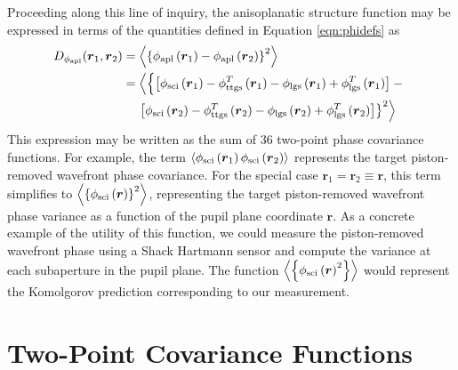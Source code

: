 Proceeding along this line of inquiry, the anisoplanatic structure
function may be expressed in terms of the quantities defined in
Equation \ref{eqn:phidefs} as
\begin{equation}\label{eqn:lgsstrfnexpansion}
\begin{split}
D_{\phi_{\rm apl}}(\boldsymbol{r}_{1},\boldsymbol{r}_{2}) & =
\left\langle \left\{\phi_{\rm apl}\left(\boldsymbol{r}_{1}\right) - 
\phi_{\rm apl}\left(\boldsymbol{r}_{2}\right)\right\}^{2}\right\rangle \\
& 
=\left\langle \left\{
\left[\phi_{\rm sci}\left(\boldsymbol{r}_{1}\right) - \phi^{T}_{\rm ttgs}\left(\boldsymbol{r}_{1}\right) - 
\phi_{\rm lgs}\left(\boldsymbol{r}_{1}\right) + \phi^{T}_{\rm lgs}\left(\boldsymbol{r}_{1}\right)\right] -
\vphantom{\left\langle\left\{\right\}^{2}\right\rangle}
\right.
\right.
\\
& \quad
\left.
\left.
\left[\phi_{\rm sci}\left(\boldsymbol{r}_{2}\right) - \phi^{T}_{\rm ttgs}\left(\boldsymbol{r}_{2}\right) - 
\phi_{\rm lgs}\left(\boldsymbol{r}_{2}\right) + \phi^{T}_{\rm lgs}\left(\boldsymbol{r}_{2}\right)\right]
\right\}^{2}\right\rangle  
\end{split}
\end{equation}
This expression may be written as the sum of 36 two-point phase
covariance functions.  For example, the term $\left\langle\phi_{\rm
  sci}\left(\boldsymbol{r}_{1}\right)\phi_{\rm
  sci}\left(\boldsymbol{r}_{2}\right)\right\rangle$ represents the
target piston-removed wavefront phase covariance.  For the special
case $\boldsymbol{r}_{1}=\boldsymbol{r}_{2}\equiv\boldsymbol{r}$, this
term simplifies to $\left\langle \left\{\phi_{\rm
  sci}\left(\boldsymbol{r}\right)\right\}^{2}\right\rangle$,
representing the target piston-removed wavefront phase variance as a
function of the pupil plane coordinate $\boldsymbol{r}$.  As a
concrete example of the utility of this function, we could measure the
piston-removed wavefront phase using a Shack Hartmann sensor and
compute the variance at each subaperture in the pupil plane.  The
function $\left\langle\left\{\phi_{\rm
  sci}\left(\boldsymbol{r}\right)^{2}\right\}\right\rangle$ would represent
the Komolgorov prediction corresponding to our measurement.

\section{Two-Point Covariance Functions}
\label{sec:covariance}

